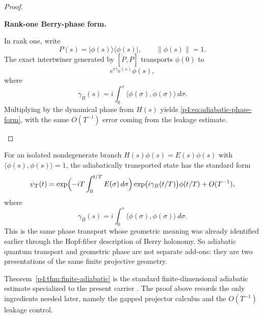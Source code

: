 \documentclass[12pt,a4paper]{article}
\begin{document}
\begin{proof}
\begin{proofsteps}
\item \textbf{Rank-one Berry-phase form.}
\leavevmode\par\noindent
In rank one, write
\[
  P(s)=|\phi(s)\rangle\langle\phi(s)|,
  \qquad
  \|\phi(s)\|=1 .
\]
The exact intertwiner generated by \([\dot P,P]\) transports \(\phi(0)\) to
\[
  e^{i\gamma_B(s)}\phi(s),
\]
where
\[
\gamma_B(s)
=
i\int_0^s\langle \phi(\sigma),\dot\phi(\sigma)\rangle\,d\sigma .
\]
Multiplying by the dynamical phase from \(H(s)\) yields
\eqref{p4:eq:adiabatic-phase-form}, with the same \(O(T^{-1})\) error coming
from the leakage estimate.
\end{proofsteps}

\end{proof}

For an isolated nondegenerate branch $H(s)\phi(s)=E(s)\phi(s)$ with $\langle \phi(s),\phi(s)\rangle=1$, the adiabatically transported state has the standard form
\begin{equation}
\label{p4:eq:adiabatic-phase-form}
\psi_T(t)
=
\exp\Bigl(-iT\int_0^{t/T}E(\sigma)\,d\sigma\Bigr)
\exp\bigl(i\gamma_B(t/T)\bigr)
\phi(t/T)
+O(T^{-1}),
\end{equation}
where
\begin{equation}
\label{p4:eq:berry-phase-again}
\gamma_B(s)=i\int_0^s \langle \phi(\sigma),\dot\phi(\sigma)\rangle\,d\sigma.
\end{equation}
This is the same phase transport whose geometric meaning was already identified earlier through the Hopf-fiber description of Berry holonomy.
So adiabatic quantum transport and geometric phase are not separate add-ons: they are two presentations of the same finite projective geometry.

\begin{remark}
\label{p4:rem:adiabatic-status}
Theorem~\ref{p4:thm:finite-adiabatic} is the standard finite-dimensional adiabatic estimate specialized to the present carrier \cite{Kato1950,Teufel2003}.
The proof above records the only ingredients needed later, namely the gapped projector calculus and the $O(T^{-1})$ leakage control.
\end{remark}
\end{document}
